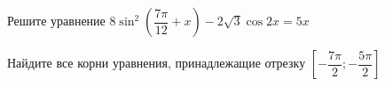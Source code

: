 \begin{ex}
	\begin{condition}
		\begin{enumcols}[label=\asbuk*)]
			\item Решите уравнение \( 8\sin^2{\left(  \dfrac{7\pi}{12}+ x \right)} - 2\sqrt{3}\cos 2x=5 x  \)
			\item Найдите все корни уравнения, принадлежащие отрезку \( \left[-\dfrac{7\pi}{2};-\dfrac{5\pi}{2}\right] \)
		\end{enumcols}
	\end{condition}
\end{ex}
